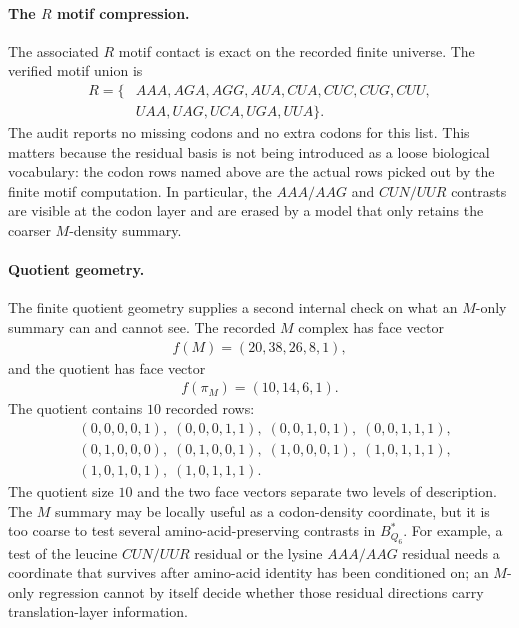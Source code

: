 \paragraph{The $R$ motif compression.}
The associated $R$ motif contact is exact on the recorded finite universe.  The verified motif union is
$$
\begin{aligned}
R=\{&AAA, AGA, AGG, AUA, CUA, CUC, CUG, CUU,\\
&UAA, UAG, UCA, UGA, UUA\}.
\end{aligned}
$$
The audit reports no missing codons and no extra codons for this list.  This matters because the residual basis is not being introduced as a loose biological vocabulary: the codon rows named above are the actual rows picked out by the finite motif computation.  In particular, the $AAA/AAG$ and $CUN/UUR$ contrasts are visible at the codon layer and are erased by a model that only retains the coarser $M$-density summary.

\paragraph{Quotient geometry.}
The finite quotient geometry supplies a second internal check on what an $M$-only summary can and cannot see.  The recorded $M$ complex has face vector
$$
\begin{aligned}
f(M)=(20,38,26,8,1),
\end{aligned}
$$
and the quotient has face vector
$$
\begin{aligned}
f(\pi_M)=(10,14,6,1).
\end{aligned}
$$
The quotient contains $10$ recorded rows:
$$
\begin{aligned}
&(0,0,0,0,1),\;(0,0,0,1,1),\;(0,0,1,0,1),\;(0,0,1,1,1),\\
&(0,1,0,0,0),\;(0,1,0,0,1),\;(1,0,0,0,1),\;(1,0,1,1,1),\\
&(1,0,1,0,1),\;(1,0,1,1,1).
\end{aligned}
$$
The quotient size $10$ and the two face vectors separate two levels of description.  The $M$ summary may be locally useful as a codon-density coordinate, but it is too coarse to test several amino-acid-preserving contrasts in $B^*_{Q_6}$.  For example, a test of the leucine $CUN/UUR$ residual or the lysine $AAA/AAG$ residual needs a coordinate that survives after amino-acid identity has been conditioned on; an $M$-only regression cannot by itself decide whether those residual directions carry translation-layer information.

